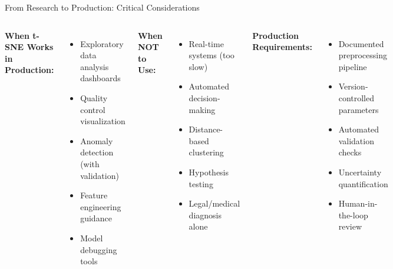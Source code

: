 \documentclass[aspectratio=169]{beamer}
\begin{document}
\begin{frame}{From Research to Production: Critical Considerations}
\begin{columns}
\textbf{When t-SNE Works in Production:}
\begin{itemize}
\item Exploratory data analysis dashboards
\item Quality control visualization
\item Anomaly detection (with validation)
\item Feature engineering guidance
\item Model debugging tools
\end{itemize}

\textbf{When NOT to Use:}
\begin{itemize}
\item Real-time systems (too slow)
\item Automated decision-making
\item Distance-based clustering
\item Hypothesis testing
\item Legal/medical diagnosis alone
\end{itemize}

\textbf{Production Requirements:}
\begin{itemize}
\item Documented preprocessing pipeline
\item Version-controlled parameters
\item Automated validation checks
\item Uncertainty quantification
\item Human-in-the-loop review
\end{itemize}

\end{columns}
\end{frame}
\end{document}
